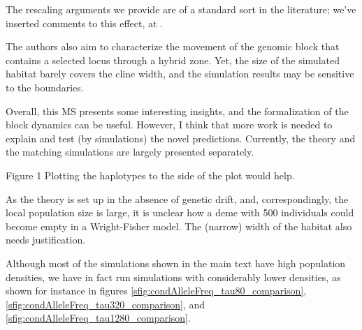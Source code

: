 \reply
{}

The rescaling arguments we provide  are of a standard sort in the literature;
we've inserted comments to this effect, at  .


\begin{point}{}
    The authors also aim to characterize the movement of the genomic block that contains a selected locus through a hybrid zone. Yet, the size of the simulated habitat barely covers the cline width, and the simulation results may be sensitive to the boundaries.

Overall, this MS presents some interesting insights, and the formalization of the block dynamics can be useful. However, I think that more work is needed to explain and test (by simulations) the novel predictions. Currently, the theory and the matching simulations are largely presented separately.
\end{point}

\reply
{}


\begin{point}{Figure 1}
 Plotting the haplotypes to the side of the plot would help.
\end{point}

\reply
{}


\begin{point}{\revref}
 As the theory is set up in the absence of genetic drift, and, correspondingly, the local population size is large, it is unclear how a deme with 500 individuals could become empty in a Wright-Fisher model.  The (narrow) width of the habitat also needs justification.
\end{point}

\reply
Although most of the simulations shown in the main text have high population densities,
we have in fact run simulations with considerably lower densities, 
as shown for instance in figures \ref{sfig:condAlleleFreq_tau80_comparison}, \ref{sfig:condAlleleFreq_tau320_comparison}, and \ref{sfig:condAlleleFreq_tau1280_comparison}.

